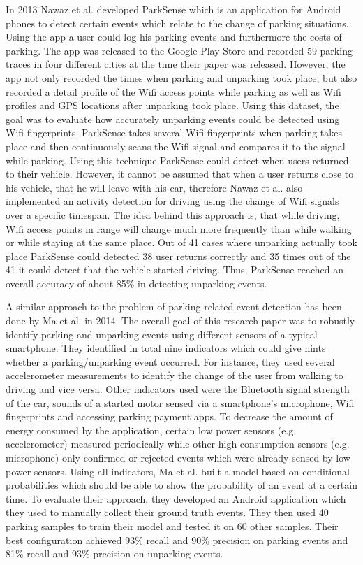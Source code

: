 In 2013 Nawaz et al. developed ParkSense \cite{Nawaz:2013:PSB:2500423.2500438} which is an application for Android phones to detect certain events which relate to the change of parking situations. Using the app a user could log his parking events and furthermore the costs of parking. The app was released to the Google Play Store and recorded 59 parking traces in four different cities at the time their paper was released. However, the app not only recorded the times when parking and unparking took place, but also recorded a detail profile of the Wifi access points while parking as well as Wifi profiles and GPS locations after unparking took place. Using this dataset, the goal was to evaluate how accurately unparking events could be detected using Wifi fingerprints. ParkSense takes several Wifi fingerprints when parking takes place and then continuously scans the Wifi signal and compares it to the signal while parking. Using this technique ParkSense could detect when users returned to their vehicle. However, it cannot be assumed that when a user returns close to his vehicle, that he will leave with his car, therefore Nawaz et al. also implemented an activity detection for driving using the change of Wifi signals over a specific timespan. The idea behind this approach is, that while driving, Wifi access points in range will change much more frequently than while walking or while staying at the same place. Out of 41 cases where unparking actually took place ParkSense could detected 38 user returns correctly and 35 times out of the 41 it could detect that the vehicle started driving. Thus, ParkSense reached an overall accuracy of about 85\% in detecting unparking events.

A similar approach to the problem of parking related event detection has been done by Ma et al. \cite{Ma:2014:USP:2674918.2674929} in 2014. The overall goal of this research paper was to robustly identify parking and unparking events using different sensors of a typical smartphone. They identified in total nine indicators which could give hints whether a parking/unparking event occurred. For instance, they used several accelerometer measurements to identify the change of the user from walking to driving and vice versa. Other indicators used were the Bluetooth signal strength of the car, sounds of a started motor sensed via a smartphone's microphone, Wifi fingerprints and accessing parking payment apps. To decrease the amount of energy consumed by the application, certain low power sensors (e.g. accelerometer) measured periodically while other high consumption sensors (e.g. microphone) only confirmed or rejected events which were already sensed by low power sensors. Using all indicators, Ma et al. built a model based on conditional probabilities which should be able to show the probability of an event at a certain time. To evaluate their approach, they developed an Android application which they used to manually collect their ground truth events. They then used 40 parking samples to train their model and tested it on 60 other samples. Their best configuration achieved 93\% recall and 90\% precision on parking events and 81\% recall and 93\% precision on unparking events.

